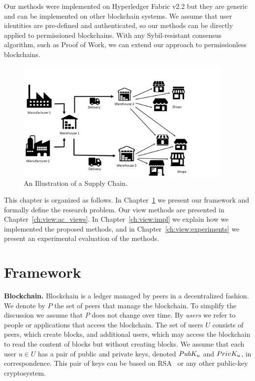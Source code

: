 Our methods were implemented on Hyperledger Fabric v2.2 but they are generic and can be implemented on other blockchain systems. We assume that user identities are pre-defined and authenticated, so our methods can be directly applied to permissioned blockchains. With any Sybil-resistant consensus algorithm, such as Proof of Work, we can extend our approach to permissionless blockchains. 

\begin{figure}
    \centering
    \includegraphics[trim=0 0 150 60, clip,width=0.94\textwidth]{diagram/view/supply_chain.png}
    \caption{An Illustration of a Supply Chain. }
    \label{diagram:view:supply_chain:}
\end{figure}

This chapter is organized as follows.
In Chapter~\ref{ch:view:framework} we present our framework and formally define the research problem. Our view methods are presented in Chapter~\ref{ch:view:ac_views}. 
In Chapter~\ref{ch:view:impl} we explain how we implemented the proposed methods, and in Chapter~\ref{ch:view:experiments} we present an experimental evaluation of the methods. 


\section{Framework}
\label{ch:view:framework}

\medskip
\noindent
\textbf{Blockchain.}
Blockchain is a ledger managed by peers in a decentralized fashion.
We denote by $P$ the set of peers that manage the blockchain. To simplify the discussion we assume that $P$ does not change over time.
By {\em users\/} we refer to people or applications that access the blockchain. The set of users $U$ consists of peers, which create blocks, and additional users, which may access the blockchain to read the content of blocks but without creating blocks. 
We assume that each user $u\in U$ has a pair of public and private keys, denoted $PubK_{u}$ and $PrivK_{u}$, in correspondence. This pair of keys can be based on RSA~\cite{rivest1978method} or any other public-key cryptosystem. 



